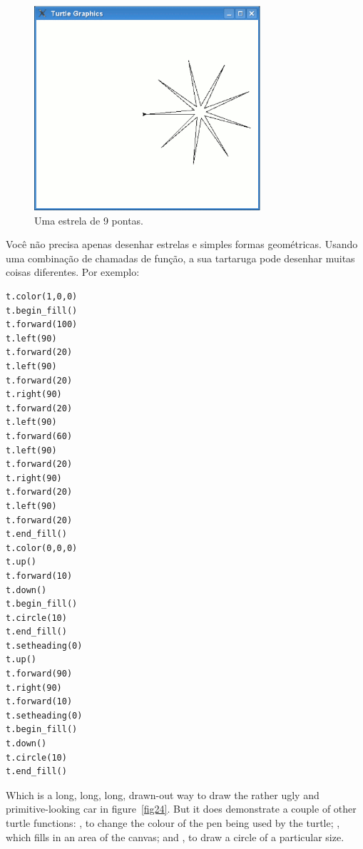 \begin{figure}
\begin{center}
\includegraphics[width=84mm]{eps/figure23.eps}
\end{center}
\caption{Uma estrela de 9 pontas.}\label{fig23}
\end{figure}

Você não precisa apenas desenhar estrelas e simples formas geométricas. Usando uma combinação de chamadas de função, a sua tartaruga pode desenhar muitas coisas diferentes. Por exemplo:

\begin{listing}
\begin{verbatim}
t.color(1,0,0)
t.begin_fill()
t.forward(100)
t.left(90)
t.forward(20)
t.left(90)
t.forward(20)
t.right(90)
t.forward(20)
t.left(90)
t.forward(60)
t.left(90)
t.forward(20)
t.right(90)
t.forward(20)
t.left(90)
t.forward(20)
t.end_fill()
t.color(0,0,0)
t.up()
t.forward(10)
t.down()
t.begin_fill()
t.circle(10)
t.end_fill()
t.setheading(0)
t.up()
t.forward(90)
t.right(90)
t.forward(10)
t.setheading(0)
t.begin_fill()
t.down()
t.circle(10)
t.end_fill()
\end{verbatim}
\end{listing}

\noindent
Which is a long, long, long, drawn-out way to draw the rather ugly and primitive-looking car in figure~\ref{fig24}. But it does demonstrate a couple of other turtle functions:  , to change the colour of the pen being used by the turtle; , which fills in an area of the canvas; and , to draw a circle of a particular size.

